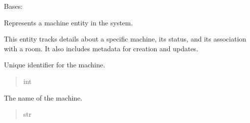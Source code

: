 \documentclass[letterpaper,10pt,english]{sphinxmanual}
\begin{document}
\begin{fulllineitems}
\label{\detokenize{app.mysql:app.mysql.machine.Machine}}
\pysigstartsignatures
\pysiglinewithargsret
{}
{}
{}
\pysigstopsignatures
\sphinxAtStartPar
Bases: 

\sphinxAtStartPar
Represents a machine entity in the system.

\sphinxAtStartPar
This entity tracks details about a specific machine, its status,
and its association with a room. It also includes metadata for
creation and updates.

\begin{fulllineitems}
\label{\detokenize{app.mysql:app.mysql.machine.Machine.idMachine}}
\pysigstartsignatures
\pysigline
{}
\pysigstopsignatures
\sphinxAtStartPar
Unique identifier for the machine.
\begin{quote}\begin{description}
\sphinxAtStartPar
int

\end{description}\end{quote}

\end{fulllineitems}


\begin{fulllineitems}
\label{\detokenize{app.mysql:app.mysql.machine.Machine.machineName}}
\pysigstartsignatures
\pysigline
{}
\pysigstopsignatures
\sphinxAtStartPar
The name of the machine.
\begin{quote}\begin{description}
\sphinxAtStartPar
str

\end{description}\end{quote}

\end{fulllineitems}



\end{fulllineitems}
\end{document}
